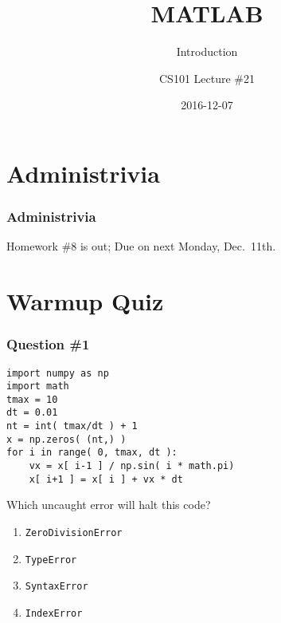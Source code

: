 \documentclass[11pt]{beamer}
\title{MATLAB}
\subtitle{Introduction}
\author{CS101 Lecture \#21}
\date{2016-12-07}
\begin{document}
  \setcounter{showProgressBar}{0}
  \setcounter{showSlideNumbers}{0}

\frame{\titlepage}

\setcounter{framenumber}{0}
\setcounter{showProgressBar}{1}
\setcounter{showSlideNumbers}{1}

\section{Administrivia}

\begin{frame}
  \frametitle{Administrivia}
  \Enlarge

   \begin{itemize}
   	\myitem  Homework \#8 is out; 
	\myitem  Due on next Monday, Dec.\ 11th.
   \end{itemize}
\end{frame}

\section{Warmup Quiz}

\begin{frame}[fragile]
  \frametitle{Question \#1}
  \Enlarge

  \begin{Verbatim}
import numpy as np
import math
tmax = 10
dt = 0.01
nt = int( tmax/dt ) + 1
x = np.zeros( (nt,) )
for i in range( 0, tmax, dt ):
    vx = x[ i-1 ] / np.sin( i * math.pi)
    x[ i+1 ] = x[ i ] + vx * dt
  \end{Verbatim}

Which uncaught error will halt this code?

  \begin{enumerate}[label=\Alph*]
    \item  \texttt{ZeroDivisionError}
    \item  \texttt{TypeError}
    \item  \texttt{SyntaxError}
    \item  \texttt{IndexError}
  \end{enumerate}
\end{frame}
\end{document}
